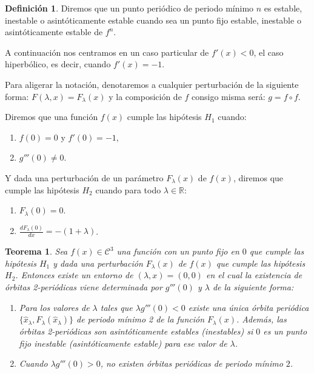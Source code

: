 \documentclass[12pt,a4paper]{report}
\newtheorem{teorema}{Teorema}[section]
\theoremstyle{definition}
\newtheorem{definicion}{Definición}[section]
\begin{document}
\begin{definicion}

Diremos que un punto periódico de periodo mínimo $n$ es estable, inestable o asintóticamente estable cuando sea un punto fijo estable, inestable o asintóticamente estable de $f^n$.
    
\end{definicion}

A continuación nos centramos en un caso particular de $f'(x) < 0$, el caso hiperbólico, es decir, cuando $f'(x) = -1$.

Para aligerar la notación, denotaremos a cualquier perturbación de la siguiente forma: \( F(\lambda,x) = F_{\lambda}(x) \) y la composición de $f$ consigo misma será: $ g = f \circ f $.

Diremos que una función \( f(x) \) cumple las hipótesis \( H_1 \) cuando: 
\begin{enumerate}
    \item  \( f(0) = 0 \) y \( f'(0) = -1 \),
    \item  \( g'''(0) \neq 0 \).
\end{enumerate}

Y dada una perturbación de un parámetro \( F_{\lambda}(x) \) de \( f(x) \), diremos que cumple las hipótesis \( H_2 \) cuando para todo $\lambda \in \mathbb{R}$:
\begin{enumerate}[start = 3]
    \item  \( F_{\lambda}(0) = 0 \).
    \item  \( \frac{dF_{\lambda}(0)}{dx} = -(1 + \lambda) \).
\end{enumerate}


\begin{teorema}
Sea \( f(x) \in \mathcal{C}^3 \) una función con un punto fijo en \( 0 \) que cumple las hipótesis \( H_1 \) y dada una perturbación \( F_{\lambda}(x) \) de \( f(x) \) que cumple las hipótesis \( H_2 \). Entonces existe un entorno de \( (\lambda,x) = (0,0) \) en el cual la existencia de órbitas 2-periódicas viene determinada por \( g'''(0) \) y \( \lambda \) de la siguiente forma:

\begin{enumerate}
    \item  Para los valores de $\lambda$ tales que \( \lambda g'''(0) < 0 \) existe una única órbita periódica \( \{\hat{x}_\lambda, F_{\lambda}(\hat{x}_\lambda) \} \) de periodo mínimo 2 de la función \( F_{\lambda}(x) \). Además, las órbitas 2-periódicas son asintóticamente estables (inestables) si \( 0 \) es un punto fijo inestable (asintóticamente estable) para ese valor de \( \lambda \).

    \item Cuando \( \lambda g'''(0) > 0 \), no existen órbitas periódicas de periodo mínimo \( 2 \). 
\end{enumerate}

\end{teorema}
\end{document}

